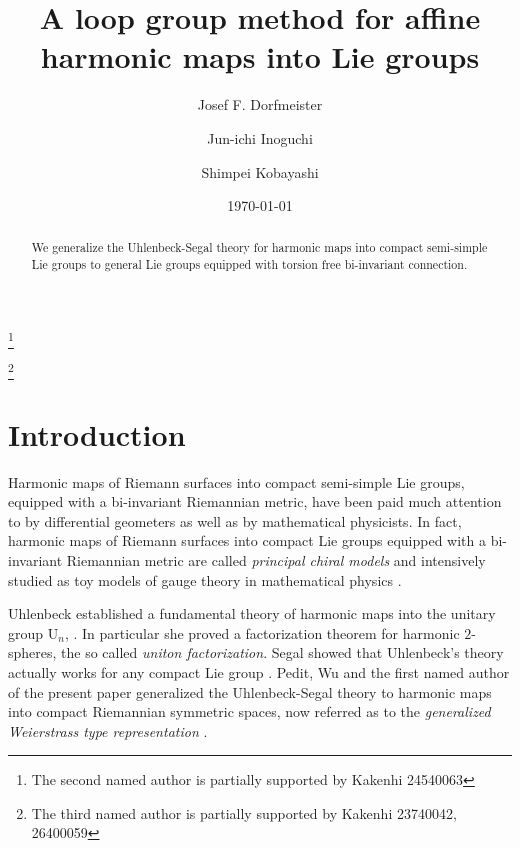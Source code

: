 \documentclass[12pt]{amsart}
\theoremstyle{definition}
\theoremstyle{remark}
\numberwithin{equation}{section}
\begin{document}
\title{A loop group method for affine harmonic maps into Lie groups}
 \author[J. F.~Dorfmeister]{Josef F. Dorfmeister}
 \address{Fakult\"at f\"ur Mathematik, 
 TU-M\"unchen, 
 Boltzmann str. 3,
 D-85747, 
 Garching, 
 Germany}
\author[J.~Inoguchi]{Jun-ichi Inoguchi}
 \address{Department of Mathematical Sciences, 
 Faculty of Science,
 Yamagata University, 
 Yamagata, 990--8560, Japan}
 \thanks{The second named author is partially supported by Kakenhi 
24540063}
 \author[S.-P.~Kobayashi]{Shimpei Kobayashi}
 \address{Department of Mathematics, Hokkaido University, 
 Sapporo, 060-0810, Japan}
 \thanks{The third named author is partially supported by Kakenhi 
23740042, 26400059}
\date{\today}
\pagestyle{plain}

\begin{abstract} 
 We generalize the Uhlenbeck-Segal theory for harmonic maps 
 into compact semi-simple Lie groups to general 
 Lie groups equipped with
 torsion free bi-invariant connection.
\end{abstract}
\maketitle
\section*{Introduction}
 Harmonic maps of Riemann surfaces into compact semi-simple Lie groups,
 equipped with a
 bi-invariant Riemannian metric, have been paid much attention to by
 differential geometers
 as well as by mathematical physicists. In fact, harmonic maps of Riemann 
 surfaces into 
 compact Lie groups equipped with a bi-invariant Riemannian metric 
 are called \textit{principal chiral models} and intensively studied as 
 toy models of gauge theory in mathematical physics \cite{Zak}. 

 Uhlenbeck established a fundamental theory of harmonic maps into
 the unitary group $\mathrm{U}_n$, \cite{Uhlenbeck}. In particular she proved a factorization theorem for
 harmonic $2$-spheres, the so called \textit{uniton factorization}.
 Segal showed that Uhlenbeck's theory actually works for any compact Lie
 group \cite{Segal}.
 Pedit, Wu and the first named author of the present paper
 generalized the Uhlenbeck-Segal theory to harmonic maps into
 compact Riemannian symmetric spaces, 
 now referred as to the \textit{generalized Weierstrass type representation} 
 \cite{DPW}.
\end{document}
